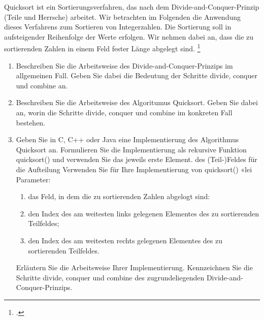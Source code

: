 \documentclass{lehramt-informatik-aufgabe}
\begin{document}

Quicksort ist ein Sortierungsverfahren, das nach dem
Divide-and-Conquer-Prinzip (Teile und Herrsche) arbeitet. Wir betrachten
im Folgenden die Anwendung dieses Verfahrens zum Sortieren von
Integerzahlen. Die Sortierung soll in aufsteigender Reihenfolge der
Werte erfolgen. Wir nehmen dabei an, dass die zu sortierenden Zahlen in
einem Feld fester Länge abgelegt sind.
\footcite{46114:2008:09}

\begin{enumerate}


\item Beschreiben Sie die Arbeitsweise des Divide-and-Conquer-Prinzips
im allgemeinen Fall. Geben Sie dabei die Bedeutung der Schritte divide,
conquer und combine an.


\item Beschreiben Sie die Arbeitsweise des Algoritumus Quicksort. Geben
Sie dabei an, worin die Schritte divide, conquer und combine im
konkreten Fall bestehen.


\item Geben Sie in C, C++ oder Java eine Implementierung des Algorithmus
Quicksort an. Formulieren Sie die Implementierung als rekursive Funktion
quicksort() und verwenden Sie das jeweils erste Element. des
(Teil-)Feldes für die Aufteilung Verwenden Sie für Ihre Implementierung
von quicksort() «lei Parameter:
\begin{enumerate}
\item

das Feld, in dem die zu sortierenden Zahlen abgelogt sind:

\item

den Index des am weitesten links gelegenen Elementes des zu sortierenden
Teilfeldes;

\item

den Index des am weitesten rechts gelegenen Elementes des zu
sortierenden Teilfeldes.
\end{enumerate}

Erläutern Sie die Arbeitsweise Ihrer Implementierung. Kennzeichnen Sie
die Schritte divide, conquer und combine des zugrundeliegenden
Divide-and-Conquer-Prinzips.
\end{enumerate}
\end{document}

